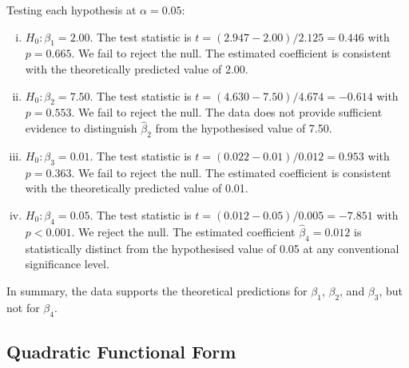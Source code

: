 \documentclass[11pt, a4paper]{article}
\begin{document}
\begin{table}[H]
	\centering
	
	\caption{Hypothesis test: \(H_0\colon \beta_2 = 7.50\).}\label{tab:q1b_x2}
\end{table}

\begin{table}[H]
	\centering
	
	\caption{Hypothesis test: \(H_0\colon \beta_3 = 0.01\).}\label{tab:q1b_x3}
\end{table}

\begin{table}[H]
	\centering
	
	\caption{Hypothesis test: \(H_0\colon \beta_4 = 0.05\).}\label{tab:q1b_x4}
\end{table}

Testing each hypothesis at \(\alpha = 0.05\):

\begin{enumerate}[(i)]
	\item \(H_0\colon \beta_1 = 2.00\). The test statistic is \(t = (2.947 - 2.00)/2.125 = 0.446\) with \(p = 0.665\). We fail to reject the null. The estimated coefficient is consistent with the theoretically predicted value of 2.00.
	\item \(H_0\colon \beta_2 = 7.50\). The test statistic is \(t = (4.630 - 7.50)/4.674 = -0.614\) with \(p = 0.553\). We fail to reject the null. The data does not provide sufficient evidence to distinguish \(\hat{\beta}_2\) from the hypothesised value of 7.50.
	\item \(H_0\colon \beta_3 = 0.01\). The test statistic is \(t = (0.022 - 0.01)/0.012 = 0.953\) with \(p = 0.363\). We fail to reject the null. The estimated coefficient is consistent with the theoretically predicted value of 0.01.
	\item \(H_0\colon \beta_4 = 0.05\). The test statistic is \(t = (0.012 - 0.05)/0.005 = -7.851\) with \(p < 0.001\). We reject the null. The estimated coefficient \(\hat{\beta}_4 = 0.012\) is statistically distinct from the hypothesised value of 0.05 at any conventional significance level.
\end{enumerate}

In summary, the data supports the theoretical predictions for \(\beta_1\), \(\beta_2\), and \(\beta_3\), but not for \(\beta_4\).

\subsection{Quadratic Functional Form}
\end{document}
